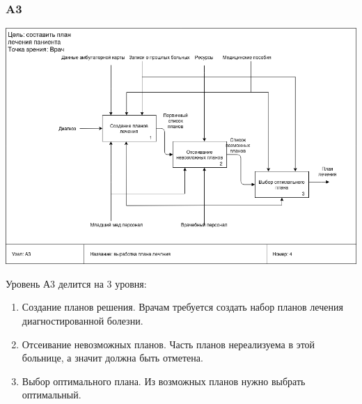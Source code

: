 \documentclass[a4paper, 12pt]{article}
\begin{document}
\subsubsection{A3}
\begin{center}
  \centering
  \includegraphics[width=1\linewidth]{extra/as-is_A3.png}
  \label{fig:prplot}
\end{center}
Уровень А3 делится на 3 уровня:
\begin{enumerate}
  \item Создание планов решения. Врачам требуется создать набор планов лечения диагностированной болезни.
  \item Отсеивание невозможных планов. Часть планов нереализуема в этой больнице, а значит должна быть отметена.
  \item Выбор оптимального плана. Из возможных планов нужно выбрать оптимальный.
\end{enumerate}
\end{document}

